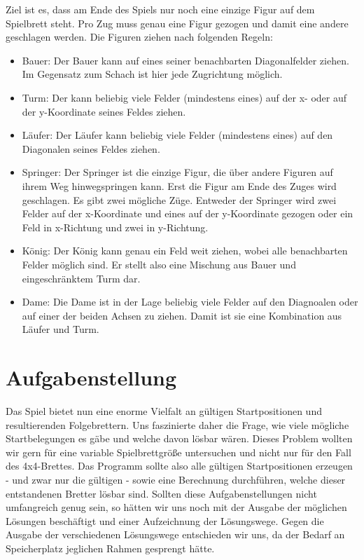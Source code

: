 \documentclass[
	12pt,
	a4paper,
	BCOR10mm,
	DIV14,
	listof=totoc,
	bibliography=totoc,
	headsepline
]{scrreprt}
\begin{document}
Ziel ist es, dass am Ende des Spiels nur noch eine einzige Figur auf dem Spielbrett steht. Pro Zug muss genau eine Figur gezogen und damit eine andere geschlagen werden.
Die Figuren ziehen nach folgenden Regeln:
\begin{itemize}
\item Bauer: 
Der Bauer kann auf eines seiner benachbarten Diagonalfelder ziehen. Im Gegensatz zum Schach ist hier jede Zugrichtung möglich.
\item Turm: Der kann beliebig viele Felder (mindestens eines) auf der x- oder auf der y-Koordinate seines Feldes ziehen.
\item Läufer: Der Läufer kann beliebig viele Felder (mindestens eines) auf den Diagonalen seines Feldes ziehen.
\item Springer: Der Springer ist die einzige Figur, die über andere Figuren auf ihrem Weg hinwegspringen kann. Erst die Figur am Ende des Zuges wird geschlagen. Es gibt zwei mögliche Züge. Entweder der Springer wird zwei Felder auf der x-Koordinate und eines auf der y-Koordinate gezogen oder ein Feld in x-Richtung und zwei in y-Richtung. 
\item König: Der König kann genau ein Feld weit ziehen, wobei alle benachbarten Felder möglich sind. Er stellt also eine Mischung aus Bauer und eingeschränktem Turm dar.
\item Dame: Die Dame ist in der Lage beliebig viele Felder auf den Diagnoalen oder auf einer der beiden Achsen zu ziehen. Damit ist sie eine Kombination aus Läufer und Turm.
\end{itemize}


\section{Aufgabenstellung}

Das Spiel bietet nun eine enorme Vielfalt an gültigen Startpositionen und resultierenden Folgebrettern.
Uns faszinierte daher die Frage, wie viele mögliche Startbelegungen es gäbe und welche davon lösbar wären.
Dieses Problem wollten wir gern für eine variable Spielbrettgröße untersuchen und nicht nur für den Fall des 4x4-Brettes.
Das Programm sollte also alle gültigen Startpositionen erzeugen - und zwar nur die gültigen - sowie eine Berechnung durchführen, welche dieser entstandenen Bretter lösbar sind.
Sollten diese Aufgabenstellungen nicht umfangreich genug sein, so hätten wir uns noch mit der Ausgabe der möglichen Lösungen beschäftigt und einer Aufzeichnung der Lösungswege.
Gegen die Ausgabe der verschiedenen Lösungswege entschieden wir uns, da der Bedarf an Speicherplatz jeglichen Rahmen gesprengt hätte.
\end{document}
